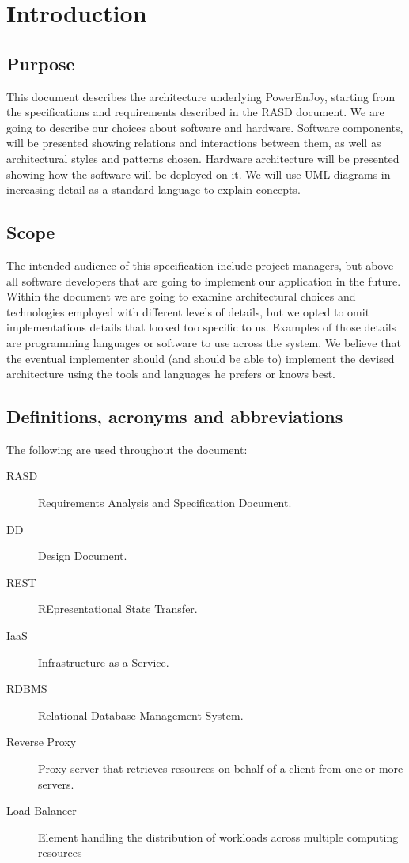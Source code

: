 \section{Introduction}

\subsection{Purpose}
This document describes the architecture underlying PowerEnJoy,
starting from the specifications and requirements described in the RASD document.
We are going to describe our choices about software and hardware.
Software components, will be presented showing relations and interactions between them,
as well as architectural styles and patterns chosen. Hardware architecture will be presented
showing how the software will be deployed on it.
We will use UML diagrams in increasing detail as a standard language to explain concepts.
 
\subsection{Scope}
The intended audience of this specification include project managers, but above all software developers 
that are going to implement our application in the future. 
Within the document we are going to examine architectural choices and technologies employed
with different levels of details, but we opted to omit implementations details that looked 
too specific to us. Examples of those details are programming languages or
software to use across the system.
We believe that the eventual implementer should (and should be able to) implement the devised
architecture using the tools and languages he prefers or knows best.
 
\subsection{Definitions, acronyms and abbreviations}
The following are used throughout the document:
\begin{description}
\item[RASD] Requirements Analysis and Specification Document.
\item[DD] Design Document.
\item[REST] REpresentational State Transfer.
\item[IaaS] Infrastructure as a Service.
\item[RDBMS] Relational Database Management System.
\item[Reverse Proxy] Proxy server that retrieves resources on behalf of a client
    from one or more servers.
\item[Load Balancer] Element handling the distribution of workloads across
    multiple computing resources
\end{description}

